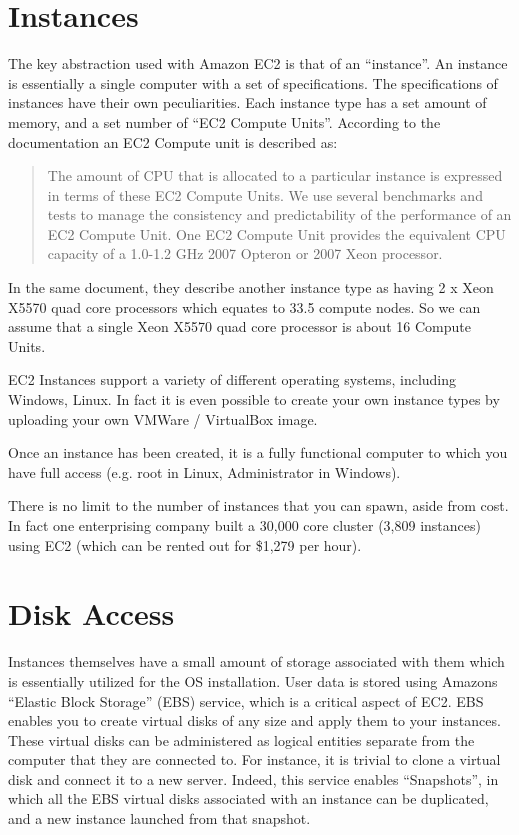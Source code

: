 \section{Instances}
The key abstraction used with Amazon EC2 is that of an ``instance''. An instance is essentially a single computer with a set of specifications. The specifications of instances have their own peculiarities. Each instance type has a set amount of memory, and a set number of ``EC2 Compute Units''. According to the documentation an EC2 Compute unit is described as:
\begin{quote}
The amount of CPU that is allocated to a particular instance is expressed in terms of these EC2 Compute Units. We use several benchmarks and tests to manage the consistency and predictability of the performance of an EC2 Compute Unit. One EC2 Compute Unit provides the equivalent CPU capacity of a 1.0-1.2 GHz 2007 Opteron or 2007 Xeon processor\ftAmThree.\ftAmThreeText
\end{quote}
In the same document, they describe another instance type as having 2 x Xeon X5570 quad core processors which equates to 33.5 compute nodes. So we can assume that a single Xeon X5570 quad core processor is about 16 Compute Units.

EC2 Instances support a variety of different operating systems, including Windows, Linux. In fact it is even possible to create your own instance types by uploading your own VMWare / VirtualBox image. 

Once an instance has been created, it is a fully functional computer to which you have full access (e.g. root in Linux, Administrator in Windows). 

There is no limit to the number of instances that you can spawn, aside from cost. In fact one enterprising company built a 30,000 core cluster (3,809 instances) using EC2 (which can be rented out for \$1,279 per hour)\ftAmFour.\ftAmFourText

\section{Disk Access}
Instances themselves have a small amount of storage associated with them which is essentially utilized for the OS installation. User data is stored using Amazons ``Elastic Block Storage'' (EBS) service, which is a critical aspect of EC2. EBS enables you to create virtual disks of any size and apply them to your instances. These virtual disks can be administered as logical entities separate from the computer that they are connected to. For instance, it is trivial to clone a virtual disk and connect it to a new server. Indeed, this service enables ``Snapshots'', in which all the EBS virtual disks associated with an instance can be duplicated, and a new instance launched from that snapshot.

